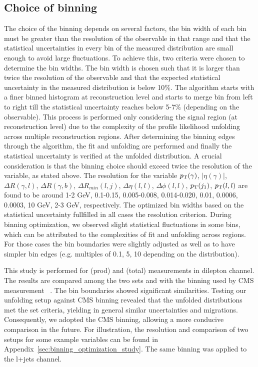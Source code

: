 \subsection{Choice of binning}
\label{sec:choice-of-binning}
The choice of the binning depends on several factors, the bin width of each bin must be greater than the resolution of the observable in that range and that the statistical uncertainties in every bin of the measured distribution are small enough to avoid large fluctuations. To achieve this, two criteria were chosen to determine the bin widths. The bin width is chosen such that it is larger than twice the resolution of the observable and that the expected statistical uncertainty in the measured distribution is below 10\%. The algorithm starts with a finer binned histogram at reconstruction level and starts to merge bin from left to right till the statistical uncertainty reaches below 5-7\% (depending on the observable). This process is performed only considering the signal region (at reconstruction level) due to the complexity of the profile likelihood unfolding across multiple reconstruction regions. After determining the binning edges through the algorithm, the fit and unfolding are performed and finally the statistical uncertainty is verified at the unfolded distribution. A crucial consideration is that the binning choice should exceed twice the resolution of the variable, as stated above. The resolution for the variable $p_{\text{T}}(\gamma)$, $|\eta(\gamma)|$, $\Delta R(\gamma,l)$, $\Delta R(\gamma,b)$, $\Delta R_{min}(l,j)$, $\Delta \eta(l,l)$, $\Delta \phi(l,l)$, $p_{\text{T}}(j_1)$, $p_{\text{T}}(l,l)$ are found to be around 1-2 GeV, 0.1-0.15, 0.005-0.008, 0.014-0.020, 0.01, 0.0006, 0.0003, 10 GeV, 2-3 GeV, respectively. The optimized bin widths based on the statistical uncertainty fullfilled in all cases the resolution criterion. During binning optimization, we observed slight statistical fluctuations in some bins, which can be attributed to the complexities of fit and unfolding across regions. For those cases the bin boundaries were slightly adjusted as well as to have simpler bin edges (e.g. multiples of 0.1, 5, 10 depending on the distribution). 

This study is performed for \tty(prod) and \tty(total) measurements in dilepton channel. The results are compared among the two sets and with the binning used by CMS measurement ~\cite{CMS2022}. The bin boundaries showed significant similarities. Testing our unfolding setup against CMS binning revealed that the unfolded distributions met the set criteria, yielding in general similar uncertainties and migrations. Consequently, we adopted the CMS binning, allowing a more conducive comparison in the future. For illustration, the resolution and comparison of two setups for some example variables can be found in Appendix~\ref{sec:binning_optimization_study}. The same binning was applied to the l+jets channel. 

